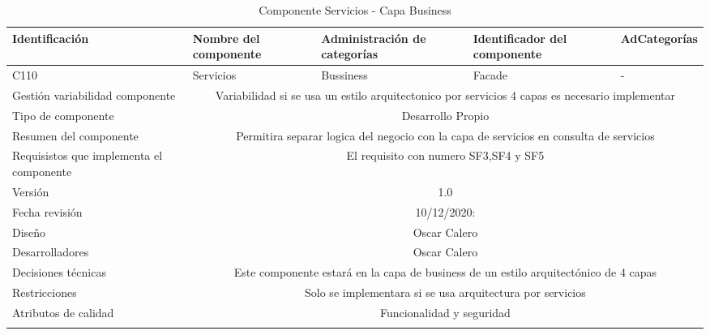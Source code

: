 \documentclass[10pt,a4paper,openany]{book}
\begin{document}
\begin{longtable}{|p{3cm}|p{3cm}|p{3cm}|p{3cm}|p{3cm}|} \hline
Identificación & Nombre del componente & Administración de categorías & Identificador del componente & AdCategorías \\[0.5ex] \hline
C110& Servicios& Bussiness& Facade& -\\[0.5ex] \hline
Gestión variabilidad componente & \multicolumn{4}{|c|}{Variabilidad si se usa un estilo arquitectonico por servicios 4 capas es necesario implementar} \\ \hline
Tipo de componente & \multicolumn{4}{|c|}{Desarrollo Propio} \\ \hline
Resumen del componente & \multicolumn{4}{|c|}{Permitira separar logica del negocio con la capa de servicios en consulta de servicios} \\ \hline
Requisistos que implementa el componente & \multicolumn{4}{|c|}{El requisito con numero SF3,SF4 y SF5 } \\ \hline
Versión & \multicolumn{4}{|c|}{1.0 } \\ \hline
Fecha revisión & \multicolumn{4}{|c|}{ 10/12/2020:} \\ \hline
Diseño & \multicolumn{4}{|c|}{Oscar Calero} \\ \hline
Desarrolladores & \multicolumn{4}{|c|}{Oscar Calero} \\ \hline
Decisiones técnicas & \multicolumn{4}{|c|}{Este componente estará en la capa de business de un estilo arquitectónico de 4 capas  } \\ \hline
Restricciones & \multicolumn{4}{|c|}{Solo se implementara si se usa arquitectura por servicios} \\ \hline
Atributos de calidad & \multicolumn{4}{|c|}{Funcionalidad y seguridad} \\ \hline
\caption{Componente Servicios - Capa Business}
\label{table:t6}
\end{longtable}
\end{document}
